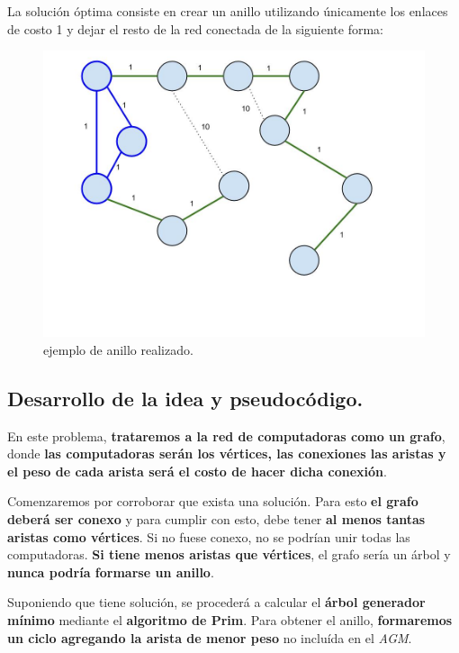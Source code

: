 La solución óptima consiste en crear un anillo utilizando únicamente los
enlaces de costo 1 y dejar el resto de la red conectada de la siguiente
forma:

\begin{figure}[htb]
  \begin{center}
      \includegraphics[scale=0.25]{imagenes/anillo-hecho.jpg}
  \end{center}
  \caption{ejemplo de anillo realizado.}
\end{figure}


\newpage
\subsection{Desarrollo de la idea y pseudocódigo.}

\vspace*{0.3cm}

En este problema, \textbf{trataremos a la red de computadoras como un grafo},
donde \textbf{las computadoras serán los vértices, las conexiones las aristas
y el peso de cada arista será el costo de hacer dicha conexión}.

Comenzaremos por corroborar que exista una solución. Para esto \textbf{el
grafo deberá ser conexo} y para cumplir con esto, debe tener \textbf{al
menos tantas aristas como vértices}. Si no fuese conexo, no se podrían
unir todas las computadoras. \textbf{Si tiene menos aristas que vértices},
el grafo sería un árbol y \textbf{nunca podría formarse un anillo}.

Suponiendo que tiene solución, se procederá a calcular el \textbf{árbol
generador mínimo} mediante el \textbf{algoritmo de Prim}. Para obtener el
anillo, \textbf{formaremos un ciclo agregando la arista de menor peso} no
incluída en el \textit{AGM}.


